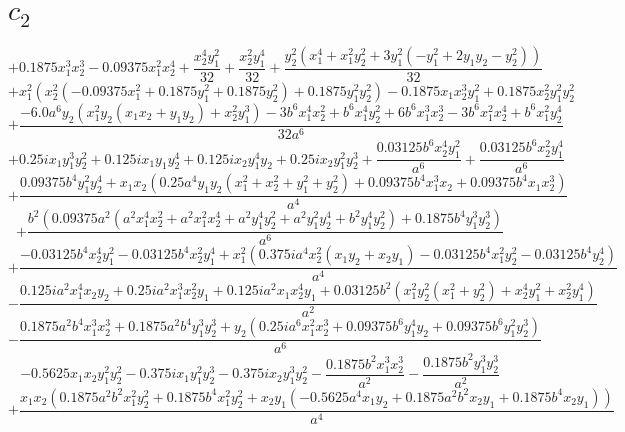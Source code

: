 \section{$c_2$}
$$+0.1875 x_{1}^{3} x_{2}^{3} - 0.09375 x_{1}^{2} x_{2}^{4} + \frac{x_{2}^{4} y_{1}^{2}}{32} + \frac{x_{2}^{2} y_{1}^{4}}{32} + \frac{y_{2}^{2} \left(x_{1}^{4} + x_{1}^{2} y_{2}^{2} + 3 y_{1}^{2} \left(- y_{1}^{2} + 2 y_{1} y_{2} - y_{2}^{2}\right)\right)}{32}$$
$$+x_{1}^{2} \left(x_{2}^{2} \left(- 0.09375 x_{1}^{2} + 0.1875 y_{1}^{2} + 0.1875 y_{2}^{2}\right) + 0.1875 y_{1}^{2} y_{2}^{2}\right) - 0.1875 x_{1} x_{2}^{3} y_{1}^{2} + 0.1875 x_{2}^{2} y_{1}^{2} y_{2}^{2}$$
$$+\frac{- 6.0 a^{6} y_{2} \left(x_{1}^{2} y_{2} \left(x_{1} x_{2} + y_{1} y_{2}\right) + x_{2}^{2} y_{1}^{3}\right) - 3 b^{6} x_{1}^{4} x_{2}^{2} + b^{6} x_{1}^{4} y_{2}^{2} + 6 b^{6} x_{1}^{3} x_{2}^{3} - 3 b^{6} x_{1}^{2} x_{2}^{4} + b^{6} x_{1}^{2} y_{2}^{4}}{32 a^{6}}$$
$$+0.25 i x_{1} y_{1}^{3} y_{2}^{2} + 0.125 i x_{1} y_{1} y_{2}^{4} + 0.125 i x_{2} y_{1}^{4} y_{2} + 0.25 i x_{2} y_{1}^{2} y_{2}^{3} + \frac{0.03125 b^{6} x_{2}^{4} y_{1}^{2}}{a^{6}} + \frac{0.03125 b^{6} x_{2}^{2} y_{1}^{4}}{a^{6}}$$
$$+\frac{0.09375 b^{4} y_{1}^{2} y_{2}^{4} + x_{1} x_{2} \left(0.25 a^{4} y_{1} y_{2} \left(x_{1}^{2} + x_{2}^{2} + y_{1}^{2} + y_{2}^{2}\right) + 0.09375 b^{4} x_{1}^{3} x_{2} + 0.09375 b^{4} x_{1} x_{2}^{3}\right)}{a^{4}}$$
$$+\frac{b^{2} \left(0.09375 a^{2} \left(a^{2} x_{1}^{4} x_{2}^{2} + a^{2} x_{1}^{2} x_{2}^{4} + a^{2} y_{1}^{4} y_{2}^{2} + a^{2} y_{1}^{2} y_{2}^{4} + b^{2} y_{1}^{4} y_{2}^{2}\right) + 0.1875 b^{4} y_{1}^{3} y_{2}^{3}\right)}{a^{6}}$$
$$+\frac{- 0.03125 b^{4} x_{2}^{4} y_{1}^{2} - 0.03125 b^{4} x_{2}^{2} y_{1}^{4} + x_{1}^{2} \left(0.375 i a^{4} x_{2}^{2} \left(x_{1} y_{2} + x_{2} y_{1}\right) - 0.03125 b^{4} x_{1}^{2} y_{2}^{2} - 0.03125 b^{4} y_{2}^{4}\right)}{a^{4}}$$
$$- \frac{0.125 i a^{2} x_{1}^{4} x_{2} y_{2} + 0.25 i a^{2} x_{1}^{3} x_{2}^{2} y_{1} + 0.125 i a^{2} x_{1} x_{2}^{4} y_{1} + 0.03125 b^{2} \left(x_{1}^{2} y_{2}^{2} \left(x_{1}^{2} + y_{2}^{2}\right) + x_{2}^{4} y_{1}^{2} + x_{2}^{2} y_{1}^{4}\right)}{a^{2}}$$
$$- \frac{0.1875 a^{2} b^{4} x_{1}^{3} x_{2}^{3} + 0.1875 a^{2} b^{4} y_{1}^{3} y_{2}^{3} + y_{2} \left(0.25 i a^{6} x_{1}^{2} x_{2}^{3} + 0.09375 b^{6} y_{1}^{4} y_{2} + 0.09375 b^{6} y_{1}^{2} y_{2}^{3}\right)}{a^{6}}$$
$$- 0.5625 x_{1} x_{2} y_{1}^{2} y_{2}^{2} - 0.375 i x_{1} y_{1}^{2} y_{2}^{3} - 0.375 i x_{2} y_{1}^{3} y_{2}^{2} - \frac{0.1875 b^{2} x_{1}^{3} x_{2}^{3}}{a^{2}} - \frac{0.1875 b^{2} y_{1}^{3} y_{2}^{3}}{a^{2}}$$
$$+\frac{x_{1} x_{2} \left(0.1875 a^{2} b^{2} x_{1}^{2} y_{2}^{2} + 0.1875 b^{4} x_{1}^{2} y_{2}^{2} + x_{2} y_{1} \left(- 0.5625 a^{4} x_{1} y_{2} + 0.1875 a^{2} b^{2} x_{2} y_{1} + 0.1875 b^{4} x_{2} y_{1}\right)\right)}{a^{4}}$$
